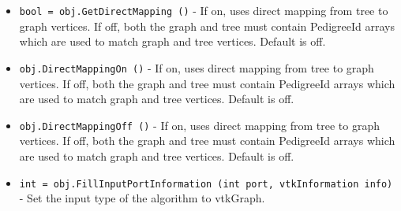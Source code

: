 \begin{itemize}
\item  \verb|bool = obj.GetDirectMapping ()| -  If on, uses direct mapping from tree to graph vertices.
 If off, both the graph and tree must contain PedigreeId arrays
 which are used to match graph and tree vertices.
 Default is off.

\item  \verb|obj.DirectMappingOn ()| -  If on, uses direct mapping from tree to graph vertices.
 If off, both the graph and tree must contain PedigreeId arrays
 which are used to match graph and tree vertices.
 Default is off.

\item  \verb|obj.DirectMappingOff ()| -  If on, uses direct mapping from tree to graph vertices.
 If off, both the graph and tree must contain PedigreeId arrays
 which are used to match graph and tree vertices.
 Default is off.

\item  \verb|int = obj.FillInputPortInformation (int port, vtkInformation info)| -  Set the input type of the algorithm to vtkGraph.

\end{itemize}
